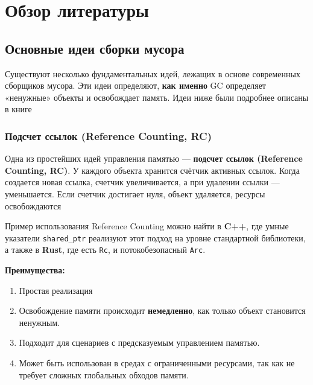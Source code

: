 \section{Обзор литературы}

\subsection{Основные идеи сборки мусора}

Существуют несколько фундаментальных идей, лежащих в основе современных сборщиков мусора. Эти идеи определяют, \textbf{как именно} GC определяет «ненужные» объекты и освобождает память. Идеи ниже были подробнее описаны в книге~\cite{gc-handbook}

\subsubsection{Подсчет ссылок (Reference Counting, RC)}

Одна из простейших идей управления памятью — \textbf{подсчет ссылок (Reference Counting, RC)}. У каждого объекта хранится счётчик активных ссылок. Когда создается новая ссылка, счетчик увеличивается, а при удалении ссылки — уменьшается. Если счетчик достигает нуля, объект удаляется, ресурсы освобождаются

Пример использования Reference Counting можно найти в \textbf{C++}, где умные указатели \texttt{shared\_ptr} реализуют этот подход на уровне стандартной библиотеки, а также в \textbf{Rust}, где есть \texttt{Rc}, и потокобезопасный \texttt{Arc}.

\textbf{Преимущества:}
\begin{enumerate}[label=\arabic*.]
    \item Простая реализация
    \item Освобождение памяти происходит \textbf{немедленно}, как только объект становится ненужным.
    \item Подходит для сценариев с предсказуемым управлением памятью.
    \item Может быть использован в средах с ограниченными ресурсами, так как не требует сложных глобальных обходов памяти.
\end{enumerate}

